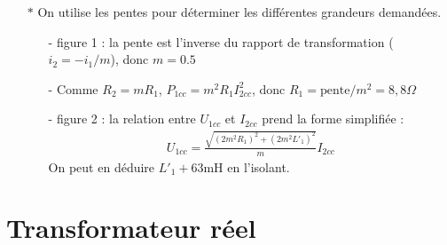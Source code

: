 \documentclass{report}
\begin{document}
\begin{itemize}
	\item[$\ast$] On utilise les pentes pour déterminer les différentes grandeurs demandées.
	\begin{itemize}
	
		\item[-] figure 1 : la pente est l’inverse du rapport de transformation ($i_2=-i_1/m$), donc $m=0.5$	
		\item[-] Comme $R_2 =m R_1$, $P_{1cc}=m^2R_1I_{2cc}^2$, donc $R_1=\mathrm{pente}/m^2=8,8\Omega$
		
		\item[-] figure 2 : la relation entre $U_{1cc}$ et $I_{2cc}$ prend la forme simplifiée :
		\begin{align*}
			U_{1cc}=\frac{\sqrt{(2m^2R_1)^2+(2m^2L'_1)^2}}{m}I_{2cc}
		\end{align*}				
		On peut en déduire $L'_1+63$mH en l'isolant.
	\end{itemize}
		
	\end{itemize}

\section*{Transformateur réel}
\end{document}
